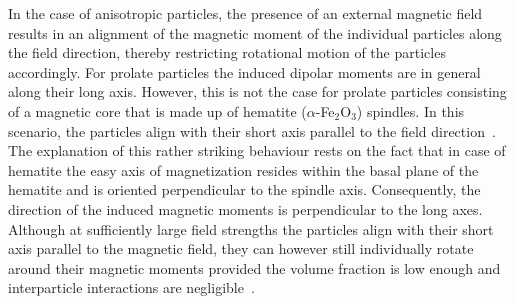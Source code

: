 \documentclass[aps,prl,preprint,superscriptaddress]{revtex4-1} %
\begin{document}
In the case of anisotropic particles, the presence of an external magnetic field results in an alignment of the magnetic moment of the individual particles along the field direction, thereby restricting rotational motion of the particles accordingly. For prolate particles the induced dipolar moments are in general along their long axis. However, this is not the case for prolate particles consisting of a magnetic core that is made up of hematite ($\alpha$-Fe$_2$O$_3$) spindles. In this scenario, the particles align with their short axis parallel to the field direction~\cite{reufer2011magnetization,reufer2010morphology}. The explanation of this rather striking behaviour rests on the fact that in case of hematite the easy axis of magnetization resides within the basal plane of the hematite and is oriented perpendicular to the spindle axis. Consequently, the direction of the induced magnetic moments is perpendicular to the long axes. Although at sufficiently large field strengths the particles align with their short axis parallel to the magnetic field, they can however still individually rotate around their magnetic moments provided the volume fraction is low enough and interparticle interactions are negligible~\cite{reufer2010morphology}. \par
\end{document}
